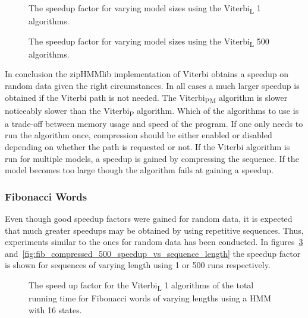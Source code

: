 \begin{figure}
  \centering
  
  \caption{The speedup factor for varying model sizes using the Viterbi\textsubscript{L} 1
    algorithms.}
  \label{fig:speedup_vs_N}
\end{figure}

\begin{figure}
  \centering
  
  \caption{The speedup factor for varying model sizes using the Viterbi\textsubscript{L} 500
    algorithms.}
  \label{fig:speedup_vs_N2}
\end{figure}

In conclusion the zipHMMlib implementation of Viterbi obtains a speedup on
random data given the right circumstances. In all cases a much larger speedup
is obtained if the Viterbi path is not needed. The Viterbi\textsubscript{PM}
algorithm is slower noticeably slower than the Viterbi\textsubscript{P} algorithm. Which
of the algorithms to use is a trade-off between memory usage and speed of the
program. If one only needs to run the algorithm once, compression should be
either enabled or disabled depending on whether the path is requested or
not. If the Viterbi algorithm is run for multiple models, a speedup is gained
by compressing the sequence. If the model becomes too large though the
algorithm fails at gaining a speedup.

\subsubsection{Fibonacci Words}

Even though good speedup factors were gained for random data, it is expected
that much greater speedups may be obtained by using repetitive
sequences. Thus, experiments similar to the ones for random data has been
conducted. In figures~\ref{fig:fib_compressed_1_speedup_vs_sequence_length}
and~\ref{fig:fib_compressed_500_speedup_vs_sequence_length} the speedup factor
is shown for sequences of varying length using 1 or 500 runs respectively.

\begin{figure}
  \centering
  
  \caption{The speed up factor for the Viterbi\textsubscript{L} 1 algorithms of the total
    running time for Fibonacci words of varying
    lengths using a HMM with 16 states.}
  \label{fig:fib_compressed_1_speedup_vs_sequence_length}
\end{figure}


